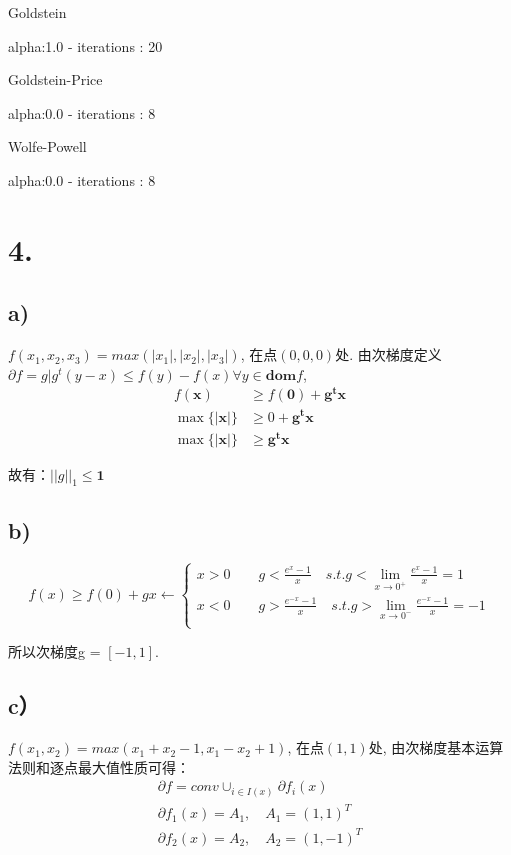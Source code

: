 \documentclass{article}
\begin{document}
    Goldstein 
    
    alpha:1.0 - iterations : 20

Goldstein-Price 

alpha:0.0 - iterations : 8

Wolfe-Powell 

alpha:0.0 - iterations : 8



	\section*{4.}
	
    \subsection*{a)}

	$f(x_1, x_2, x_3) = max(|x_1|, |x_2|, |x_3|)$, 在点$(0,0,0)$处. 由次梯度定义$\partial f = {g | g^t(y-x) \le f(y)-f(x)} \forall y \in \mathbf{dom} f$,
	\begin{align*}
		f(\mathbf{x}) &\ge f(\mathbf{0})+ \mathbf{g^t} \mathbf{x} \\
		\max \{ |\mathbf{x}| \} &\ge 0 + \mathbf{g^t} \mathbf{x}  \\
		\max \{ |\mathbf{x}| \} &\ge  \mathbf{g^t} \mathbf{x} 
	\end{align*}
	
	故有：$|| g||_1 \le \mathbf{1}$

    \subsection*{b)}

	\begin{equation*}
		f(x) \ge f(0) + gx \leftarrow
		\begin{cases}
			x>0 \quad \quad g < \frac{e^x -1 }{x} \quad s.t. g< \lim_{x \to 0^+}\frac{e^x -1 }{x}  = 1\\
			x<0 \quad \quad g > \frac{e^{-x} -1 }{x} \quad s.t. g> \lim_{x \to 0^-}\frac{e^{-x} -1 }{x} = -1 \\
		\end{cases} 
	\end{equation*}

	所以次梯度g = $[-1,1]$.

    \subsection*{c）}

    $f(x_1, x_2) = max (x_1+x_2-1, x_1-x_2+1)$, 在点$(1,1)$处,
    由次梯度基本运算法则和逐点最大值性质可得：
    \begin{gather*}
        \partial f = conv \cup_{i \in I(x)} \partial f_i(x) \\
        \partial f_1(x) = A_1 , \quad A_1 = (1, 1)^T \\
        \partial f_2(x) = A_2 , \quad A_2 = (1, -1)^T \\
    \end{gather*}
    
\end{document}
